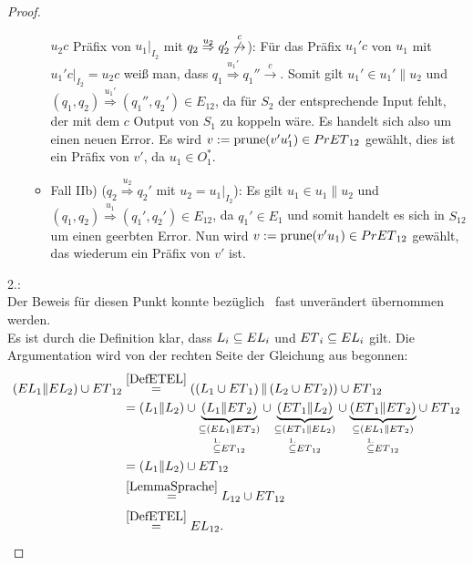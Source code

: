 \begin{proof}
\begin{itemize}
\begin{itemize}
        $u_2c$ Präfix von $u_1|_{I_2}$ mit $q_2 \overset{u_2}{\Rightarrow} q_2'
        \overset{c}{\not{\hspace{-0.1cm}\rightarrow}}$\Big): Für das Präfix $u_1'c$
        von $u_1$ mit $u_1'c|_{I_2}=u_2c$ weiß man, dass $q_1
        \overset{u_1'}{\Rightarrow} q_1'' \overset{c}{\rightarrow}$. Somit gilt
        $u_1'\in u_1'\|u_2$ und $(q_1,q_2) \overset{u_1'}{\Rightarrow}
        (q_1'',q_2')\in E_{12}$, da für $S_2$ der entsprechende Input fehlt,
        der mit dem $c$ Output von $S_1$ zu koppeln wäre. Es handelt sich also
        um einen neuen Error. Es wird $v:=\mathrm{prune}{}(v'u_1')\in PrET{}_{12}$ gewählt,
        dies ist ein Präfix von $v'$, da $u_1\in O_1^*$.
      \item Fall IIb) \big($q_2 \overset{u_2}{\Rightarrow} q_2'$ mit
        $u_2=u_1|_{I_2}$\big): Es gilt $u_1\in u_1\|u_2$ und $(q_1,q_2)
        \overset{u_1}{\Rightarrow} (q_1',q_2')\in E_{12}$, da $q_1'\in E_1$ und
        somit handelt es sich in $S_{12}$ um einen geerbten Error. Nun wird $v:=\mathrm{prune}{}
        (v'u_1)\in PrET{}_{12}$ gewählt, das wiederum ein Präfix von $v'$ ist.
    \end{itemize}
  \end{itemize}

  2.:\\
  Der Beweis für diesen Punkt konnte bezüglich~\cite{Vogler2014EIO} fast
  unverändert übernommen werden.\\
  Es ist durch die Definition klar, dass $L_i\subseteq EL{}_i$ und
  $ET{}_i\subseteq EL{}_i$ gilt. Die Argumentation wird von der rechten
  Seite der Gleichung aus begonnen:
  \begin{align*}
    (EL{}_1\| EL{}_2)\cup ET{}_{12}&\overset{\ref{DefETEL}}{=}\left(\left(L_1\cup
  ET{}_1\right)\|\left(L_2\cup ET{}_2\right)\right)\cup ET{}_{12}\\
    &=(L_1\|L_2) \cup \underset{\overset{1.}{\subseteq} ET{}_{12}}{\underset{\subseteq
    (EL{}_1\|ET{}_2)}{\underbrace{(L_1\|ET{}_2)}}} \cup
    \underset{\overset{1.}{\subseteq} ET{}_{12}}{\underset{\subseteq
    (ET{}_1\|EL{}_2)}{\underbrace{(ET{}_1\|L_2)}}} \cup
     \underset{\overset{1.}{\subseteq}
    ET{}_{12}}{\underset{\subseteq (EL{}_1\|ET{}_2)}{\underbrace{(ET{}_1\|ET{}_2)}}} \cup
    ET{}_{12}\\
    &=(L_1\|L_2) \cup ET{}_{12}\\
    &\overset{\ref{LemmaSprache}}{=}L_{12}\cup ET{}_{12}\\
    &\overset{\ref{DefETEL}}{=}EL{}_{12}.
  \end{align*}
\end{proof}

